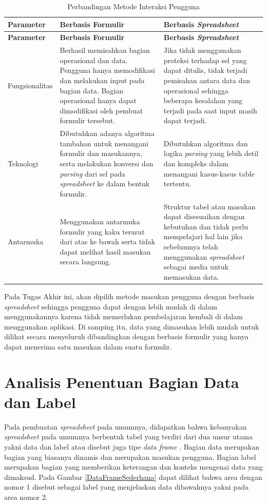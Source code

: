 	\begin{small}
	\begin{longtable}{ | p{3cm} | p{4cm} | p{4cm} | }
	    \caption{Perbandingan Metode Interaksi Pengguna}
	    \label{ModelInteraksi}\\ \hline
	    \centering\bfseries{Parameter} & \centering\bfseries{Berbasis Formulir} & \centering\bfseries{Berbasis \textit{Spreadsheet}} \tabularnewline \hline
	    \endfirsthead
	    \hline
	    \centering\bfseries{Parameter} & \centering\bfseries{Berbasis Formulir} & \centering\bfseries{Berbasis \textit{Spreadsheet}} \tabularnewline \hline
	    \endhead
	    Fungsionalitas & Berhasil memisahkan bagian operasional dan data. Pengguna hanya memodifikasi dan melakukan input pada bagian data. Bagian operasional hanya dapat dimodifikasi oleh pembuat formulir tersebut. & Jika tidak menggunakan proteksi terhadap sel yang dapat ditulis, tidak terjadi pemisahan antara data dan operasional sehingga beberapa kesalahan yang terjadi pada saat input masih dapat terjadi. \\ \hline
	    Teknologi & Dibutuhkan adanya algoritma tambahan untuk menangani formulir dan masukannya, serta melakukan konversi dan \textit{parsing} dari sel pada \textit{spreadsheet} ke dalam bentuk formulir. & Dibutuhkan algoritma dan logika \textit{parsing} yang lebih detil dan kompleks dalam menangani kasus-kasus table tertentu. \\ \hline
	    Antarmuka & Menggunakan antarmuka formulir yang kaku terurut dari atas ke bawah serta tidak dapat melihat hasil masukan secara langsung. & Struktur tabel atau masukan dapat disesuaikan dengan kebutuhan dan tidak perlu mempelajari hal lain jika sebelumnya telah menggunakan \textit{spreadsheet} sebagai media untuk memasukan data. \\ \hline
  	\end{longtable}
	\end{small}

  	Pada Tugas Akhir ini, akan dipilih metode masukan pengguna dengan berbasis \textit{spreadsheet} sehingga pengguna dapat dengan lebih mudah di dalam menggunakannya karena tidak memerlukan pembelajaran kembali di dalam menggunakan aplikasi. Di samping itu, data yang dimasukan lebih mudah untuk dilihat secara menyeluruh dibandingkan dengan berbasis formulir yang hanya dapat menerima satu masukan dalam suatu formulir.

\section{Analisis Penentuan Bagian Data dan Label}
Pada pembuatan \textit{spreadsheet} pada umumnya, didapatkan bahwa kebanyakan \textit{spreadsheet} pada umumnya berbentuk tabel yang terdiri dari dua unsur utama yakni data dan label atau disebut juga tipe \textit{data frame} \citep{Chen2013}. Bagian data merupakan bagian yang biasanya dinamis dan merupakan masukan pengguna. Bagian label merupakan bagian yang memberikan keterangan dan konteks mengenai data yang dimaksud. Pada Gambar \ref{DataFrameSederhana} dapat dilihat bahwa area dengan nomor 1 disebut sebagai label yang menjelaskan data dibawahnya yakni pada area nomor 2.

